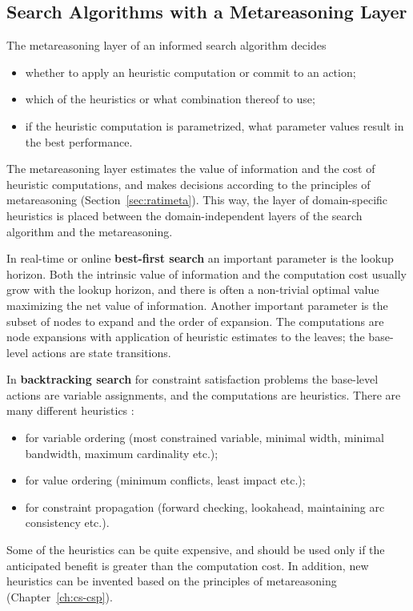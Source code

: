\subsection{Search Algorithms
  with a Metareasoning Layer}

The metareasoning layer of an informed search algorithm decides
\begin{itemize}
\item whether to apply an heuristic computation or commit to an action;
\item which of the heuristics or what combination thereof to use;
\item if the heuristic computation is parametrized, what parameter values
  result in the best performance.
\end{itemize}
The metareasoning layer estimates the value of information and the
cost of heuristic computations, and makes decisions according to
the principles of metareasoning (Section~\ref{sec:ratimeta}). This
way, the layer of domain-specific heuristics is placed between the
domain-independent layers of the search algorithm and the
metareasoning.

In real-time or online {\bf best-first search} an important parameter
is the lookup horizon. Both the intrinsic value of information and the
computation cost usually grow with the lookup horizon, and there is
often a non-trivial optimal value maximizing the net value of
information. Another important parameter is the subset of nodes to
expand and the order of expansion. The computations are node
expansions with application of heuristic estimates to the leaves; the
base-level actions are state transitions.

In {\bf backtracking search} for constraint satisfaction problems
the base-level actions are variable assignments, and the computations are
heuristics.  There are many different heuristics \cite{Tsang.csp}:
\begin{itemize}
\item for variable ordering (most constrained variable, minimal width,
  minimal bandwidth, maximum cardinality etc.);
\item for value ordering (minimum conflicts, least impact etc.);
\item for constraint propagation (forward checking, lookahead, maintaining arc
  consistency etc.).
\end{itemize}
Some of the heuristics can be quite expensive, and should be used only
if the anticipated benefit is greater than the computation
cost. In addition, new heuristics can be invented based on the
principles of metareasoning (Chapter~\ref{ch:cs-csp}).

